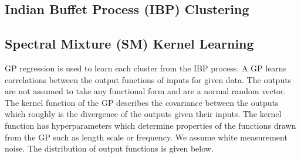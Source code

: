 \documentclass{article}
\begin{document}
\subsection{Indian Buffet Process (IBP) Clustering}
%
%
%


\subsection{Spectral Mixture (SM) Kernel Learning}

GP regression is used to learn each cluster from the IBP process. A GP learns correlations between the output functions of inputs for given data. The outputs are not assumed to take any functional form and are a normal random vector. The kernel function of the GP describes the covariance between the outputs which roughly is the divergence of the outputs given their inputs. The kernel function has hyperparameters which determine properties of the functions drawn from the GP such as length scale or frequency. We assume white measurement noise. The distribution of output functions is given below.
\end{document}
